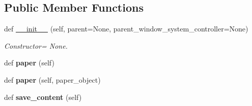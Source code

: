 \subsection*{Public Member Functions}
\begin{DoxyCompactItemize}
\item 
def \hyperlink{classplume-creator_1_1src_1_1plume_1_1gui_1_1write__panel_1_1_write_sub_window_a46131a070fa82741597c5c541625f81b}{\+\_\+\+\_\+init\+\_\+\+\_\+} (self, parent=None, parent\+\_\+window\+\_\+system\+\_\+controller=None)\hypertarget{classplume-creator_1_1src_1_1plume_1_1gui_1_1write__panel_1_1_write_sub_window_a46131a070fa82741597c5c541625f81b}{}\label{classplume-creator_1_1src_1_1plume_1_1gui_1_1write__panel_1_1_write_sub_window_a46131a070fa82741597c5c541625f81b}

\begin{DoxyCompactList}\small\item\em Constructor= None. \end{DoxyCompactList}\item 
def {\bfseries paper} (self)\hypertarget{classplume-creator_1_1src_1_1plume_1_1gui_1_1write__panel_1_1_write_sub_window_a40d930916996617b51dcb8888d5dae82}{}\label{classplume-creator_1_1src_1_1plume_1_1gui_1_1write__panel_1_1_write_sub_window_a40d930916996617b51dcb8888d5dae82}

\item 
def {\bfseries paper} (self, paper\+\_\+object)\hypertarget{classplume-creator_1_1src_1_1plume_1_1gui_1_1write__panel_1_1_write_sub_window_af33e769f0aa3e30846bda86309e53b4f}{}\label{classplume-creator_1_1src_1_1plume_1_1gui_1_1write__panel_1_1_write_sub_window_af33e769f0aa3e30846bda86309e53b4f}

\item 
def {\bfseries save\+\_\+content} (self)\hypertarget{classplume-creator_1_1src_1_1plume_1_1gui_1_1write__panel_1_1_write_sub_window_a16001dc0ed367a7d52b4c20709192077}{}\label{classplume-creator_1_1src_1_1plume_1_1gui_1_1write__panel_1_1_write_sub_window_a16001dc0ed367a7d52b4c20709192077}

\end{DoxyCompactItemize}
